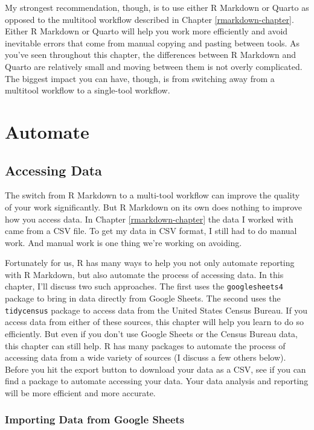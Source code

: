 \documentclass[
]{book}
\begin{document}
My strongest recommendation, though, is to use either R Markdown or Quarto as opposed to the multitool workflow described in Chapter \ref{rmarkdown-chapter}. Either R Markdown or Quarto will help you work more efficiently and avoid inevitable errors that come from manual copying and pasting between tools. As you've seen throughout this chapter, the differences between R Markdown and Quarto are relatively small and moving between them is not overly complicated. The biggest impact you can have, though, is from switching away from a multitool workflow to a single-tool workflow.

\hypertarget{part-automate}{%
\part*{Automate}\label{part-automate}}

\hypertarget{accessing-data-chapter}{%
\chapter{Accessing Data}\label{accessing-data-chapter}}

The switch from R Markdown to a multi-tool workflow can improve the quality of your work significantly. But R Markdown on its own does nothing to improve how you access data. In Chapter \ref{rmarkdown-chapter} the data I worked with came from a CSV file. To get my data in CSV format, I still had to do manual work. And manual work is one thing we're working on avoiding.

Fortunately for us, R has many ways to help you not only automate reporting with R Markdown, but also automate the process of accessing data. In this chapter, I'll discuss two such approaches. The first uses the \texttt{googlesheets4} package to bring in data directly from Google Sheets. The second uses the \texttt{tidycensus} package to access data from the United States Census Bureau. If you access data from either of these sources, this chapter will help you learn to do so efficiently. But even if you don't use Google Sheets or the Census Bureau data, this chapter can still help. R has many packages to automate the process of accessing data from a wide variety of sources (I discuss a few others below). Before you hit the export button to download your data as a CSV, see if you can find a package to automate accessing your data. Your data analysis and reporting will be more efficient and more accurate.

\hypertarget{importing-data-from-google-sheets}{%
\section*{Importing Data from Google Sheets}\label{importing-data-from-google-sheets}}
\end{document}
